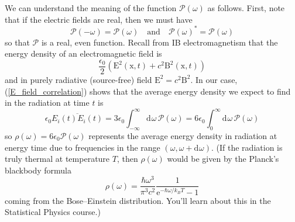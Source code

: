 \documentclass{article}
\theoremstyle{plain}\theoremheaderfont{\normalfont\itshape}\theorembodyfont{\rmfamily}\theoremseparator{.}\newtheorem*{rem}{Remark}\newtheorem*{ex}{Example}\newtheorem*{proof}{Proof}\newtheorem*{altp}{Alternative proof}
\theoremstyle{plain}\theoremheaderfont{\normalfont\bfseries}\theorembodyfont{\rmfamily}\theoremseparator{.}\newtheorem{thm}{Theorem}[section]\newtheorem{lem}[thm]{Lemma}\newtheorem{prop}[thm]{Proposition}\newtheorem*{cor}{Corollary}\newtheorem{defn}[thm]{Definition}\newtheorem{clm}[thm]{Claim}\newtheorem{clminproof}{Claim}
\theoremstyle{break}\theoremheaderfont{\normalfont\itshape}\theorembodyfont{\rmfamily}\theoremseparator{.\medskip}\newtheorem*{proofskip}{Proof}\newtheorem*{exs}{Examples}\newtheorem*{rems}{Remarks}
\theoremstyle{break}\theoremheaderfont{\normalfont\bfseries}\theorembodyfont{\rmfamily}\theoremseparator{.\medskip}\newtheorem{lemskip}[thm]{Lemma}\newtheorem{defnskip}[thm]{Definition}\newtheorem{propskip}[thm]{Proposition}\newtheorem{thmskip}[thm]{Theorem}
\numberwithin{equation}{section}
\newcommand{\ee}{\mathrm{e}}
\newcommand{\dd}[2][]{\mathrm{d}^{#1} #2\,}
\renewcommand{\d}[2][]{\mathrm{d}^{#1} #2}
\newcommand{\vb}[1]{\bm{\mathrm{#1}}}
\begin{document}
    We can understand the meaning of the function \(\mathcal{P}(\omega)\) as follows. First, note that if the electric fields are real, then we must have
    \begin{equation}\label{P_conditions}
        \mathcal{P}(-\omega)=\mathcal{P}(\omega)\quad\text{and}\quad\mathcal{P}(\omega)^*=\mathcal{P}(\omega)
    \end{equation}
    so that \(\mathcal{P}\) is a real, even function. Recall from IB electromagnetism that the energy density of an electromagnetic field is
    \begin{equation}
        \frac{\epsilon_0}{2}(\vb{E}^2(\vb{x},t)+c^2\vb{B}^2(\vb{x},t))
    \end{equation}
    and in purely radiative (source-free) field \(\vb{E}^2=c^2\vb{B}^2\). In our case, (\ref{E_field_correlation}) shows that the average energy density we expect to find in the radiation at time \(t\) is
    \begin{equation}
        \epsilon_0\overline{E_i(t)E_i(t)}=3\epsilon_0\int_{-\infty}^{\infty}\dd{\omega}\mathcal{P}(\omega)=6\epsilon_0\int_{0}^{\infty}\dd{\omega}\mathcal{P}(\omega)
    \end{equation}
    so \(\rho(\omega)=6\epsilon_0\mathcal{P}(\omega)\) represents the average energy density in radiation at energy time due to frequencies in the range \((\omega,\omega+\d{\omega})\). (If the radiation is truly thermal at temperature \(T\), then \(\rho(\omega)\) would be given by the Planck's blackbody formula
    \begin{equation}
        \rho(\omega)=\frac{\hbar\omega^3}{\pi^3 c^2}\frac{1}{\ee^{-\hbar\omega/k_B T}-1}
    \end{equation}
    coming from the Bose--Einstein distribution. You'll learn about this in the Statistical Physics course.)
\end{document}
